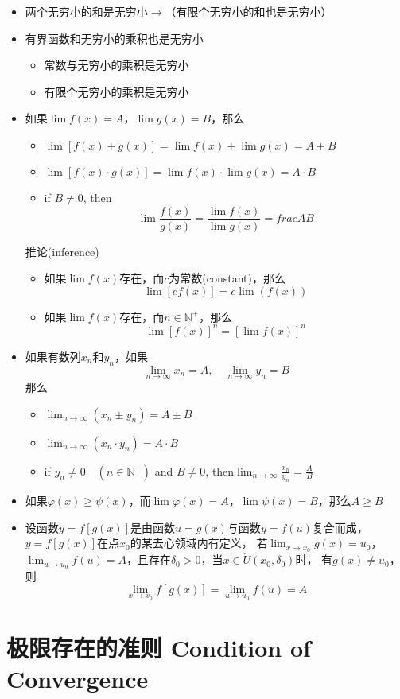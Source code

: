 \documentclass[UTF8]{ctexart}
\begin{document}
\begin{itemize}
  \item 两个无穷小的和是无穷小$\to$（有限个无穷小的和也是无穷小）
  \item 有界函数和无穷小的乘积也是无穷小
  \begin{itemize}
    \item 常数与无穷小的乘积是无穷小
    \item 有限个无穷小的乘积是无穷小
  \end{itemize}
  \item 如果$\lim f(x)=A$，$\lim g(x)=B$，那么
  \begin{itemize}
    \item $\lim[f(x)\pm g(x)]=\lim f(x)\pm \lim g(x)=A\pm B$
    \item $\lim[f(x)\cdot g(x)]=\lim f(x)\cdot \lim g(x)=A\cdot B$
    \item if $B\ne0$, then
    \[
      \lim \frac{f(x)}{g(x)}=\frac{\lim f(x)}{\lim g(x)}=frac{A}{B}
    \]
  \end{itemize}
  推论(inference)
  \begin{itemize}
    \item 如果$\lim f(x)$存在，而$c$为常数(constant)，那么
    \[ \lim[cf(x)]=c\lim(f(x)) \]
    \item 如果$\lim f(x)$存在，而$n\in\mathbb{N}^+$，那么
    \[ \lim[f(x)]^n = [\lim f(x)]^n\]
  \end{itemize}
  \item 如果有数列${x_n}$和${y_n}$，如果
  \[ \lim_{n\to\infty}x_n=A,\quad\lim_{n\to\infty}y_n=B \]
  那么
  \begin{itemize}
    \item $\lim_{n\to\infty}(x_n\pm y_n)=A\pm B$
    \item $\lim_{n\to\infty}(x_n\cdot y_n)=A\cdot B$
    \item if $y_n\ne0\quad(n\in\mathbb{N}^+)$ and $B\ne0$, then$\lim_{n\to\infty}\frac{x_n}{y_n}=\frac{A}{B}$
  \end{itemize}
  \item 如果$\varphi(x)\ge\psi(x)$，而$\lim\varphi(x)=A$，$\lim\psi(x)=B$，那么$A\ge B$
  \item 设函数$y=f[g(x)]$是由函数$u=g(x)$与函数$y=f(u)$复合而成，$y=f[g(x)]$在点$x_0$的某去心领域内有定义，
  若$\lim_{x\to x_0}g(x)=u_0$，$\lim_{u\to u_0}f(u)=A$，且存在$\delta_0>0$，当$x\in\mathring{U}(x_0,\delta_0)$时，
  有$g(x)\ne u_0$，则\[\lim_{x\to x_0}f[g(x)]=\lim_{u\to u_0}f(u)=A\]
\end{itemize}
\bigskip
\bigskip
\section*{极限存在的准则 Condition of Convergence}
\end{document}
